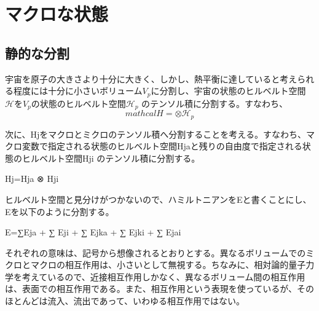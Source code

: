 \section{マクロな状態}
\subsection{静的な分割}
宇宙を原子の大きさより十分に大きく、しかし、熱平衡に達していると考えられる程度には十分に小さいボリューム$V_p$に分割し、宇宙の状態のヒルベルト空間$\mathcal{H}$を$V_p$の状態のヒルベルト空間$\mathcal{H}_p$ のテンソル積に分割する。すなわち、
\begin{equation}
mathcal{H}=\otimes \mathcal{H}_p
\end{equation}

次に、Hjをマクロとミクロのテンソル積へ分割することを考える。すなわち、マクロ変数で指定される状態のヒルベルト空間Hjaと残りの自由度で指定される状態のヒルベルト空間Hji のテンソル積に分割する。

Hj=Hja ⊗ Hji

ヒルベルト空間と見分けがつかないので、ハミルトニアンをEと書くことにし、Eを以下のように分割する。

E=∑Eja + ∑ Eji + ∑ Ejka + ∑ Ejki + ∑ Ejai

それぞれの意味は、記号から想像されるとおりとする。異なるボリュームでのミクロとマクロの相互作用は、小さいとして無視する。ちなみに、相対論的量子力学を考えているので、近接相互作用しかなく、異なるボリューム間の相互作用は、表面での相互作用である。また、相互作用という表現を使っているが、そのほとんどは流入、流出であって、いわゆる相互作用ではない。